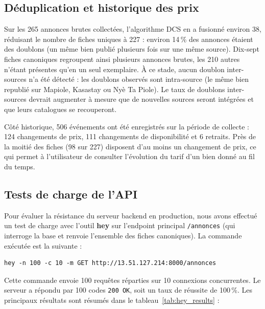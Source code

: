 \subsection{D\'eduplication et historique des prix}
Sur les 265 annonces brutes collect\'ees, l'algorithme DCS en a fusionn\'e environ 38, r\'eduisant le nombre de fiches uniques \`a 227 : environ 14\,\% des annonces \'etaient des doublons (un m\^eme bien publi\'e plusieurs fois sur une m\^eme source). Dix-sept fiches canoniques regroupent ainsi plusieurs annonces brutes, les 210 autres n'\'etant pr\'esentes qu'en un seul exemplaire. \`A ce stade, aucun doublon inter-sources n'a \'et\'e d\'etect\'e : les doublons observ\'es sont intra-source (le m\^eme bien republi\'e sur Mapiole, Kasastay ou Ny\`e Ta Piole). Le taux de doublons inter-sources devrait augmenter \`a mesure que de nouvelles sources seront int\'egr\'ees et que leurs catalogues se recouperont.

C\^ot\'e historique, 506 \'ev\'enements ont \'et\'e enregistr\'es sur la p\'eriode de collecte : 124 changements de prix, 111 changements de disponibilit\'e et 6 retraits. Pr\`es de la moiti\'e des fiches (98 sur 227) disposent d'au moins un changement de prix, ce qui permet \`a l'utilisateur de consulter l'\'evolution du tarif d'un bien donn\'e au fil du temps.

\subsection{Tests de charge de l'API}
Pour \'evaluer la r\'esistance du serveur backend en production, nous avons effectu\'e un test de charge avec l'outil \textbf{hey} sur l'endpoint principal \texttt{/annonces} (qui interroge la base et renvoie l'ensemble des fiches canoniques). La commande ex\'ecut\'ee est la suivante :

\begin{verbatim}
hey -n 100 -c 10 -m GET http://13.51.127.214:8000/annonces
\end{verbatim}

Cette commande envoie 100 requ\^etes r\'eparties sur 10 connexions concurrentes. Le serveur a r\'epondu par 100 codes \texttt{200 OK}, soit un taux de r\'eussite de 100\,\%. Les principaux r\'esultats sont r\'esum\'es dans le tableau~\ref{tab:hey_results} :

